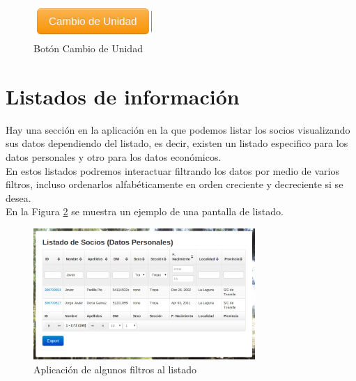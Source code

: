 \begin{figure}[H]
\begin{center}
\includegraphics[width=0.40\textwidth]{images/cambio_unidad.jpg}
\caption{Botón Cambio de Unidad}
\label{fig:cambio_unidad}
\end{center}
\end{figure}

\section{Listados de información}
\label{3:sec4}

Hay una sección en la aplicación en la que podemos listar los socios visualizando sus datos dependiendo del listado, es decir, existen un listado especifico para los datos personales y otro para los datos económicos.\\

En estos listados podremos interactuar filtrando los datos por medio de varios filtros, incluso ordenarlos alfabéticamente en orden creciente y decreciente si se desea.\\

En la Figura \ref{fig:listado} se muestra un ejemplo de una pantalla de listado.

\begin{figure}[H]
\begin{center}
\includegraphics[width=0.75\textwidth]{images/filtrado.jpg}
\caption{Aplicación de algunos filtros al listado}
\label{fig:listado}
\end{center}
\end{figure}



